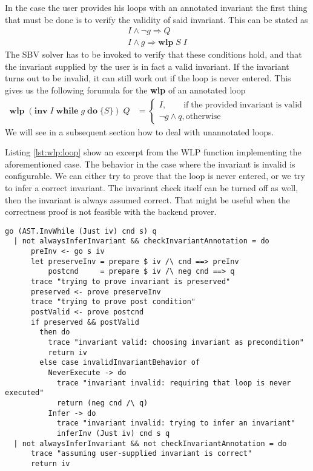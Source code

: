 \documentclass[]{scrartcl}
\newcommand{\IWHILE}[3]{\ensuremath{\mathbf{inv}\;#1\;\mathbf{while}\;#2\;\mathbf{do}\;\{#3\}}}
\newcommand{\WLP}[2]{\ensuremath{\mathbf{wlp}\;#1\;#2}}
\begin{document}
In the case the user provides his loops with an annotated invariant the first
thing that must be done is to verify the validity of said invariant.
This can be stated as
\begin{align}
  I \land \neg g \Rightarrow Q \\
  I \land g \Rightarrow \WLP{S}{I}
\end{align}
The SBV solver has to be invoked to verify that these conditions hold, and that
the invariant supplied by the user is in fact a valid invariant.
If the invariant turns out to be invalid, it can still work out if the loop
is never entered. This gives us the following forumula for the \textbf{wlp} of an annotated
loop
\begin{align}
  \WLP{(\IWHILE{I}{g}{S})}{Q} &=
    \begin{cases}
      I, \qquad  \mathrm{if \; the \; provided \; invariant \; is \; valid}\\
      \neg g \land q, \mathrm{otherwise}
    \end{cases}
\end{align}
We will see in a subsequent section how to deal with unannotated loops.

Listing \ref{lst:wlp:loop} show an excerpt from the WLP function implementing the aforementioned case.
The behavior in the case where the invariant is invalid is configurable. We can either try to prove
that the loop is never entered, or we try to infer a correct invariant.
The invariant check itself can be turned off as well, then the invariant is always assumed correct.
That might be useful when the correctness proof is not feasible with the backend prover.

\begin{lstlisting}[caption=WLP loop case, label=lst:wlp:loop]
go (AST.InvWhile (Just iv) cnd s) q
  | not alwaysInferInvariant && checkInvariantAnnotation = do
      preInv <- go s iv
      let preserveInv = prepare $ iv /\ cnd ==> preInv
          postcnd     = prepare $ iv /\ neg cnd ==> q
      trace "trying to prove invariant is preserved"
      preserved <- prove preserveInv
      trace "trying to prove post condition"
      postValid <- prove postcnd
      if preserved && postValid
        then do
          trace "invariant valid: choosing invariant as precondition"
          return iv
        else case invalidInvariantBehavior of
          NeverExecute -> do
            trace "invariant invalid: requiring that loop is never executed"
            return (neg cnd /\ q)
          Infer -> do
            trace "invariant invalid: trying to infer an invariant"
            inferInv (Just iv) cnd s q
  | not alwaysInferInvariant && not checkInvariantAnnotation = do
      trace "assuming user-supplied invariant is correct"
      return iv
\end{lstlisting}
\end{document}
